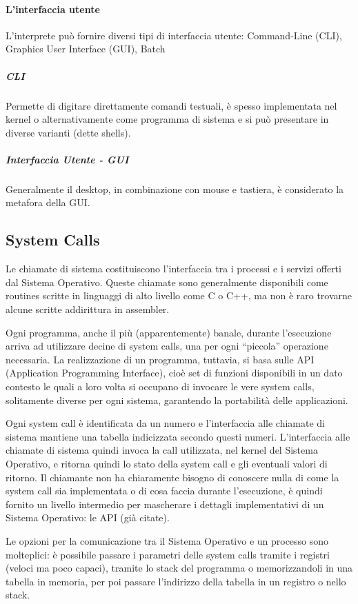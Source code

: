 \documentclass[a4]{article}
\begin{document}
\paragraph{L'interfaccia utente}
L'interprete può fornire diversi tipi di interfaccia utente: Command-Line (CLI), Graphics User Interface (GUI), Batch
\subparagraph{CLI} Permette di digitare direttamente comandi testuali, è spesso implementata nel kernel o alternativamente come programma di sistema e si può presentare in diverse varianti (dette shells).
\subparagraph{Interfaccia Utente - GUI} Generalmente il desktop, in combinazione con mouse e tastiera, è considerato la metafora della GUI.

\subsection{System Calls}
Le chiamate di sistema costituiscono l'interfaccia tra i processi e i servizi offerti dal Sistema Operativo. Queste chiamate sono generalmente disponibili come routines scritte in linguaggi di alto livello come C o C++, ma non è raro trovarne alcune scritte addirittura in assembler.

Ogni programma, anche il più (apparentemente) banale, durante l'esecuzione arriva ad utilizzare decine di system calls, una per ogni ``piccola'' operazione necessaria.\newline
La realizzazione di un programma, tuttavia, si basa sulle API (Application Programming Interface), cioè set di funzioni disponibili in un dato contesto le quali a loro volta si occupano di invocare le vere system calls, solitamente diverse per ogni sistema, garantendo la portabilità delle applicazioni.

Ogni system call è identificata da un numero e l'interfaccia alle chiamate di sistema mantiene una tabella indicizzata secondo questi numeri. L'interfaccia alle chiamate di sistema quindi invoca la call utilizzata, nel kernel del Sistema Operativo, e ritorna quindi lo stato della system call e gli eventuali valori di ritorno. Il chiamante non ha chiaramente bisogno di conoscere nulla di come la system call sia implementata o di cosa faccia durante l'esecuzione, è quindi fornito un livello intermedio per mascherare i dettagli implementativi di un Sistema Operativo: le API (già citate).

Le opzioni per la comunicazione tra il Sistema Operativo e un processo sono molteplici: è possibile passare i parametri delle system calls tramite i registri (veloci ma poco capaci), tramite lo stack del programma o memorizzandoli in una tabella in memoria, per poi passare l'indirizzo della tabella in un registro o nello stack.
\end{document}
